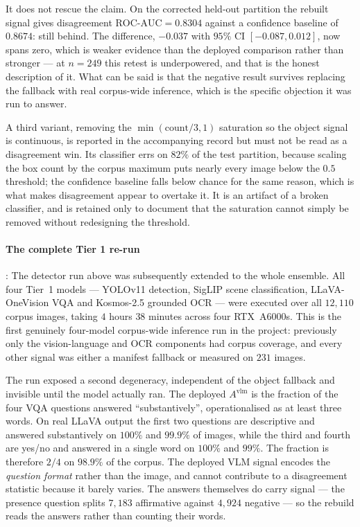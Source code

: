 \documentclass[12pt,a4paper]{report}
\begin{document}
\begin{enumerate}
It does not rescue the claim. On the corrected held-out partition the rebuilt signal gives disagreement $\text{ROC-AUC}=0.8304$ against a confidence baseline of $0.8674$: still behind. The difference, $-0.037$ with $95\%$ CI $[-0.087, 0.012]$, now spans zero, which is weaker evidence than the deployed comparison rather than stronger --- at $n=249$ this retest is underpowered, and that is the honest description of it. What can be said is that the negative result survives replacing the fallback with real corpus-wide inference, which is the specific objection it was run to answer.

A third variant, removing the $\min(\text{count}/3, 1)$ saturation so the object signal is continuous, is reported in the accompanying record but must not be read as a disagreement win. Its classifier errs on $82\%$ of the test partition, because scaling the box count by the corpus maximum puts nearly every image below the $0.5$ threshold; the confidence baseline falls below chance for the same reason, which is what makes disagreement appear to overtake it. It is an artifact of a broken classifier, and is retained only to document that the saturation cannot simply be removed without redesigning the threshold.

\paragraph{The complete Tier 1 re-run}: The detector run above was subsequently extended to the whole ensemble. All four Tier~1 models --- YOLOv11 detection, SigLIP scene classification, LLaVA-OneVision VQA and Kosmos-2.5 grounded OCR --- were executed over all $12{,}110$ corpus images, taking $4$ hours $38$ minutes across four RTX~A6000s. This is the first genuinely four-model corpus-wide inference run in the project: previously only the vision-language and OCR components had corpus coverage, and every other signal was either a manifest fallback or measured on $231$ images.

The run exposed a second degeneracy, independent of the object fallback and invisible until the model actually ran. The deployed $A^{\text{vlm}}$ is the fraction of the four VQA questions answered ``substantively'', operationalised as at least three words. On real LLaVA output the first two questions are descriptive and answered substantively on $100\%$ and $99.9\%$ of images, while the third and fourth are yes/no and answered in a single word on $100\%$ and $99\%$. The fraction is therefore $2/4$ on $\mathbf{98.9\%}$ of the corpus. The deployed VLM signal encodes the \emph{question format} rather than the image, and cannot contribute to a disagreement statistic because it barely varies. The answers themselves do carry signal --- the presence question splits $7{,}183$ affirmative against $4{,}924$ negative --- so the rebuild reads the answers rather than counting their words.


\end{enumerate}
\end{document}
